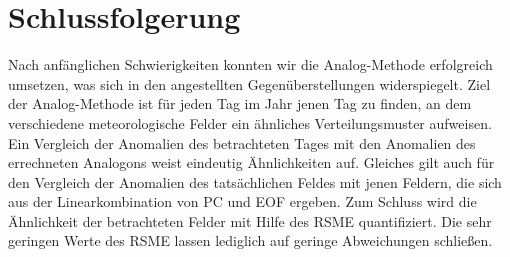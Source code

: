 \documentclass[12pt]{article}
\begin{document}
\section{Schlussfolgerung}
Nach anfänglichen Schwierigkeiten konnten wir die Analog-Methode erfolgreich umsetzen, was sich in den angestellten Gegenüberstellungen widerspiegelt. Ziel der Analog-Methode ist für jeden Tag im Jahr jenen Tag zu finden, an dem verschiedene meteorologische Felder ein ähnliches Verteilungsmuster aufweisen. Ein Vergleich der Anomalien des betrachteten Tages mit den Anomalien des errechneten Analogons weist eindeutig Ähnlichkeiten auf. Gleiches gilt auch für den Vergleich der Anomalien des tatsächlichen Feldes mit jenen Feldern, die sich aus der Linearkombination von PC und EOF ergeben. Zum Schluss wird die Ähnlichkeit der betrachteten Felder mit Hilfe des RSME quantifiziert. Die sehr geringen Werte des RSME lassen lediglich auf geringe Abweichungen schließen. 
\end{document}
